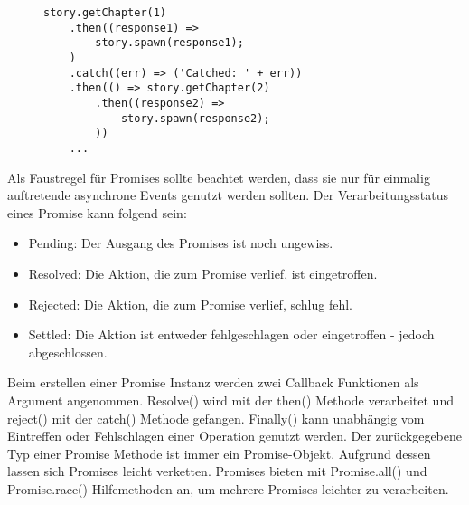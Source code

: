 \begin{figure}[H]
\begin{lstlisting}[basicstyle=\small]
story.getChapter(1)
    .then((response1) =>
        story.spawn(response1);
    )
    .catch((err) => ('Catched: ' + err))
    .then(() => story.getChapter(2)
        .then((response2) => 
            story.spawn(response2);
        ))
    ...
    \end{lstlisting}
\end{figure}

\noindent
Als Faustregel für Promises sollte beachtet werden, dass sie nur für einmalig auftretende asynchrone Events genutzt werden sollten. Der Verarbeitungsstatus eines Promise kann folgend sein:

\begin{itemize} 
\item Pending: Der Ausgang des Promises ist noch ungewiss.
\item Resolved: Die Aktion, die zum Promise verlief, ist eingetroffen.
\item Rejected: Die Aktion, die zum Promise verlief, schlug fehl.
\item Settled: Die Aktion ist entweder fehlgeschlagen oder eingetroffen - jedoch abgeschlossen.
\end{itemize}

\noindent
Beim erstellen einer Promise Instanz werden zwei Callback Funktionen als Argument angenommen. Resolve() wird mit der then() Methode verarbeitet und reject() mit der catch() Methode gefangen. Finally() kann unabhängig vom Eintreffen oder Fehlschlagen einer Operation genutzt werden. Der zurückgegebene Typ einer Promise Methode ist immer ein Promise-Objekt. Aufgrund dessen lassen sich Promises leicht verketten. Promises bieten mit Promise.all() und Promise.race() Hilfemethoden an, um mehrere Promises leichter zu verarbeiten.




